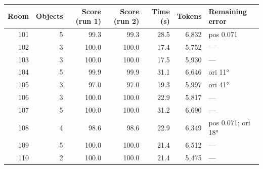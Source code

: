 \begin{tabular}{@{}rrrrrrl@{}}
\toprule
Room & Objects & Score (run 1) & Score (run 2) & Time (s) & Tokens & Remaining error \\
\midrule
101 & 5 & 99.3 & 99.3 & 28.5 & 6,832 & pos 0.071 \\
102 & 3 & 100.0 & 100.0 & 17.4 & 5,752 & — \\
103 & 3 & 100.0 & 100.0 & 17.5 & 5,930 & — \\
104 & 5 & 99.9 & 99.9 & 31.1 & 6,646 & ori 11° \\
105 & 3 & 97.0 & 97.0 & 19.3 & 5,997 & ori 41° \\
106 & 3 & 100.0 & 100.0 & 22.9 & 5,817 & — \\
107 & 5 & 100.0 & 100.0 & 31.2 & 6,690 & — \\
108 & 4 & 98.6 & 98.6 & 22.9 & 6,349 & pos 0.071; ori 18° \\
109 & 5 & 100.0 & 100.0 & 21.4 & 6,512 & — \\
110 & 2 & 100.0 & 100.0 & 21.4 & 5,475 & — \\
\bottomrule
\end{tabular}
